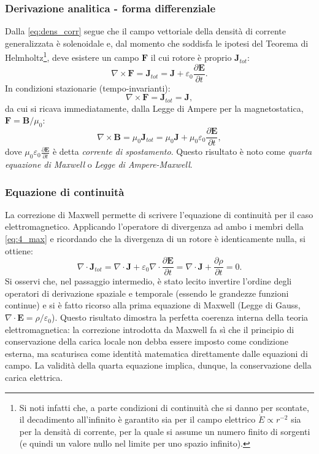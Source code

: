 \documentclass[a4paper,11pt]{report}
\begin{document}
\subsubsection{Derivazione analitica - forma differenziale}
Dalla \eqref{eq:dens_corr} segue che il campo vettoriale della densità di corrente generalizzata è solenoidale e, dal momento che soddisfa le ipotesi del Teorema di Helmholtz\footnote{Si noti infatti che, a parte condizioni di continuità che si danno per scontate, il decadimento all'infinito è garantito sia per il campo elettrico $\dot{E} \propto r^{-2}$ sia per la densità di corrente, per la quale si assume un numero finito di sorgenti (e quindi un valore nullo nel limite per uno spazio infinito).}, deve esistere un campo $\bm{F}$ il cui rotore è proprio $\bm{J}_{tot}$:
\begin{equation}
\nabla \times \bm{F} = \bm{J}_{tot} = \bm{J} + \varepsilon_0\frac{\partial\bm{E}}{\partial t}.
\end{equation}
In condizioni stazionarie (tempo-invarianti):
\begin{equation}
\nabla \times \bm{F} = \bm{J}_{tot} = \bm{J},
\end{equation}
da cui si ricava immediatamente, dalla Legge di Ampere per la magnetostatica, $\bm{F} = \bm{B}/\mu_0$:  
\begin{equation}
\nabla \times \bm{B} = \mu_0\bm{J}_{tot} = \mu_0\bm{J} +\mu_0\varepsilon_0\frac{\partial\bm{E}}{\partial t},
\label{eq:4_max}
\end{equation}
dove $\mu_0\varepsilon_0\frac{\partial\bm{E}}{\partial t}$ è detta \textit{corrente di spostamento}. Questo risultato è noto come \textit{quarta equazione di Maxwell} o \textit{Legge di Ampere-Maxwell}. 

\subsubsection{Equazione di continuità}
La correzione di Maxwell permette di scrivere l'equazione di continuità per il caso elettromagnetico. Applicando l'operatore di divergenza ad ambo i membri della \eqref{eq:4_max} e ricordando che la divergenza di un rotore è identicamente nulla, si ottiene:
\begin{equation}
\nabla \cdot \bm{J}_{tot} = \nabla \cdot \bm{J} + \varepsilon_0 \nabla \cdot \frac{\partial\bm{E}}{\partial t} = \nabla \cdot \bm{J} + \frac{\partial\rho}{\partial t} = 0.
\end{equation}
Si osservi che, nel passaggio intermedio, è stato lecito invertire l'ordine degli operatori di derivazione spaziale e temporale (essendo le grandezze funzioni continue) e si è fatto ricorso alla prima equazione di Maxwell (Legge di Gauss, $\nabla \cdot \bm{E} = \rho/\varepsilon_0$).
Questo risultato dimostra la perfetta coerenza interna della teoria elettromagnetica: la correzione introdotta da Maxwell fa sì che il principio di conservazione della carica locale non debba essere imposto come condizione esterna, ma scaturisca come identità matematica direttamente dalle equazioni di campo. La validità della quarta equazione implica, dunque, la conservazione della carica elettrica.
\end{document}
